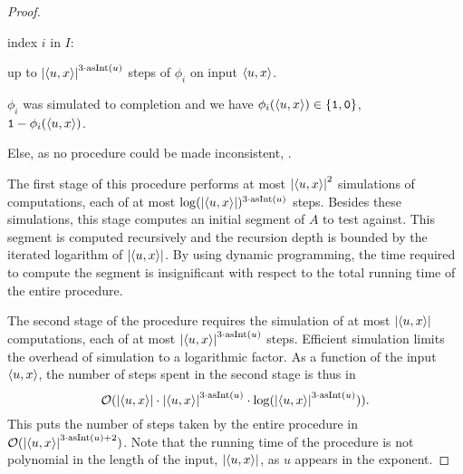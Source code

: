 \begin{proof}
\begin{codelisting}
    \begin{codelisting}
    \item
       index $i$ in $I$:
      \begin{codelisting}
      \item
         up to $\length{\pair{u}{x}}^{3 \cdot \asNat(u)}$ steps of $\phi_i$ on input $\pair{u}{x}$.
      \item
         $\phi_i$ was simulated to completion and we have $\phi_i(\pair{u}{x}) \in \{\bits{1}, \bits{0}\}$,
        \\\-\quad {} $\bits{1} - \phi_i(\pair{u}{x})$.
      \end{codelisting}
    \item
      Else, as no procedure could be made inconsistent,  .
    \end{codelisting}
  \end{codelisting}

  The first stage of this procedure performs at most ${\lvert{\langle u, x\rangle}\rvert}^2$ simulations of computations, each of at most $\log({\lvert{\langle u, x\rangle}\rvert})^{3 \cdot \operatorname{asInt}(u)}$ steps.
  Besides these simulations, this stage computes an initial segment of $A$ to test against.
  This segment is computed recursively and the recursion depth is bounded by the iterated logarithm of ${\lvert{\langle u, x\rangle}\rvert}$.
  By using dynamic programming, the time required to compute the segment is insignificant with respect to the total running time of the entire procedure.

  The second stage of the procedure requires the simulation of at most ${\lvert{\langle u, x\rangle}\rvert}$ computations, each of at most ${\lvert{\langle u, x\rangle}\rvert}^{3 \cdot \operatorname{asInt}(u)}$ steps.
  Efficient simulation \parencite{arora2009computational} limits the overhead of simulation to a logarithmic factor.
  As a function of the input ${\langle u, x\rangle}$, the number of steps spent in the second stage is thus in
  \begin{equation*}
    \operatorname{\mathcal{O}}({\lvert{\langle u, x\rangle}\rvert} \cdot {\lvert{\langle u, x\rangle}\rvert}^{3 \cdot \operatorname{asInt}(u)} \cdot \log({\lvert{\langle u, x\rangle}\rvert}^{3 \cdot \operatorname{asInt}(u)})).
  \end{equation*}
  This puts the number of steps taken by the entire procedure in $\operatorname{\mathcal{O}}({\lvert{\langle u, x\rangle}\rvert}^{3 \cdot \operatorname{asInt}(u) + 2})$.
  Note that the running time of the procedure is not polynomial in the length of the input, ${\lvert{\langle u, x\rangle}\rvert}$, as $u$ appears in the exponent.


\end{proof}
